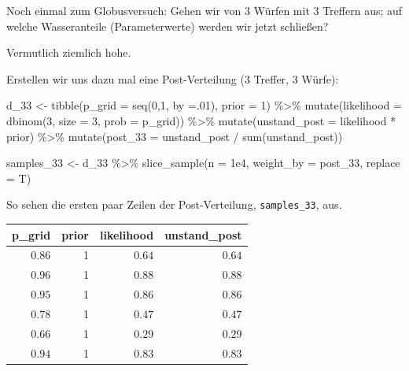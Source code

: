 \documentclass[
  a4paper,
  DIV=11]{scrreprt}
\newenvironment{Shaded}{\begin{snugshade}}{\end{snugshade}}
\newcommand{\AttributeTok}[1]{\textcolor[rgb]{0.40,0.45,0.13}{#1}}
\newcommand{\DecValTok}[1]{\textcolor[rgb]{0.68,0.00,0.00}{#1}}
\newcommand{\FloatTok}[1]{\textcolor[rgb]{0.68,0.00,0.00}{#1}}
\newcommand{\FunctionTok}[1]{\textcolor[rgb]{0.28,0.35,0.67}{#1}}
\newcommand{\NormalTok}[1]{\textcolor[rgb]{0.00,0.23,0.31}{#1}}
\newcommand{\OtherTok}[1]{\textcolor[rgb]{0.00,0.23,0.31}{#1}}
\newcommand{\SpecialCharTok}[1]{\textcolor[rgb]{0.37,0.37,0.37}{#1}}
\theoremstyle{definition}
\theoremstyle{remark}
\begin{document}
Noch einmal zum Globusversuch: Gehen wir von 3 Würfen mit 3 Treffern
aus; auf welche Wasseranteile (Parameterwerte) werden wir jetzt
schließen?

Vermutlich ziemlich hohe.

Erstellen wir uns dazu mal eine Post-Verteilung (3 Treffer, 3 Würfe):

\begin{Shaded}
\begin{Highlighting}[]
\NormalTok{d\_33 }\OtherTok{\textless{}{-}} 
  \FunctionTok{tibble}\NormalTok{(}\AttributeTok{p\_grid =} \FunctionTok{seq}\NormalTok{(}\DecValTok{0}\NormalTok{,}\DecValTok{1}\NormalTok{, }\AttributeTok{by =}\NormalTok{.}\DecValTok{01}\NormalTok{),}
         \AttributeTok{prior =} \DecValTok{1}\NormalTok{) }\SpecialCharTok{\%\textgreater{}\%} 
  \FunctionTok{mutate}\NormalTok{(}\AttributeTok{likelihood =} \FunctionTok{dbinom}\NormalTok{(}\DecValTok{3}\NormalTok{, }\AttributeTok{size =} \DecValTok{3}\NormalTok{, }\AttributeTok{prob =}\NormalTok{ p\_grid)) }\SpecialCharTok{\%\textgreater{}\%} 
  \FunctionTok{mutate}\NormalTok{(}\AttributeTok{unstand\_post =}\NormalTok{ likelihood }\SpecialCharTok{*}\NormalTok{ prior) }\SpecialCharTok{\%\textgreater{}\%} 
  \FunctionTok{mutate}\NormalTok{(}\AttributeTok{post\_33  =}\NormalTok{ unstand\_post }\SpecialCharTok{/} \FunctionTok{sum}\NormalTok{(unstand\_post)) }

\NormalTok{samples\_33 }\OtherTok{\textless{}{-}} 
\NormalTok{  d\_33 }\SpecialCharTok{\%\textgreater{}\%} 
    \FunctionTok{slice\_sample}\NormalTok{(}\AttributeTok{n =} \FloatTok{1e4}\NormalTok{, }
                 \AttributeTok{weight\_by =}\NormalTok{ post\_33, }
                 \AttributeTok{replace =}\NormalTok{ T)}
\end{Highlighting}
\end{Shaded}

So sehen die ersten paar Zeilen der Post-Verteilung,
\texttt{samples\_33}, aus.

\begin{longtable}{rrrr}
\toprule
p\_grid & prior & likelihood & unstand\_post \\ 
\midrule
$0.86$ & 1 & $0.64$ & $0.64$ \\ 
$0.96$ & 1 & $0.88$ & $0.88$ \\ 
$0.95$ & 1 & $0.86$ & $0.86$ \\ 
$0.78$ & 1 & $0.47$ & $0.47$ \\ 
$0.66$ & 1 & $0.29$ & $0.29$ \\ 
$0.94$ & 1 & $0.83$ & $0.83$ \\ 
\bottomrule
\end{longtable}
\end{document}
